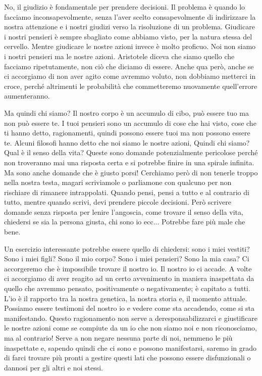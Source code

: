 \documentclass[12pt]{book} %
\begin{document}
No, il giudizio è fondamentale per prendere decisioni. Il problema è quando lo facciamo inconsapevolmente, senza
l'aver scelto consapevolmente di indirizzare la nostra attenzione e i nostri giudizi verso la
risoluzione di un problema. Giudicare i nostri pensieri è sempre sbagliato come abbiamo visto, per la natura stessa del
cervello. Mentre giudicare le nostre azioni invece è molto proficuo. Noi non siamo i nostri pensieri ma le nostre
azioni. Aristotele diceva che siamo quello che facciamo ripetutamente, non ciò che diciamo di essere. Anche qua però, anche se ci accorgiamo di non aver agito come avremmo voluto, non dobbiamo metterci in croce, perché altrimenti le probabilità che commetteremo nuovamente quell'errore aumenteranno. 

Ma quindi chi siamo? Il nostro corpo è un accumulo di cibo, può essere tuo ma non può essere te. I tuoi pensieri sono un
accumulo di cose che hai visto, cose che ti hanno detto, ragionamenti, quindi possono essere tuoi ma non possono essere
te. Alcuni filosofi hanno detto che noi siamo le nostre azioni, Quindi chi siamo? Qual è il senso della vita? Queste sono domande
potenzialmente pericolose perché non troveranno mai una risposta certa e si potrebbe finire in una spirale infinita. Ma
sono anche domande che è giusto porsi! Cerchiamo però di non tenerle troppo nella nostra testa, magari scriviamole o
parliamone con qualcuno per non rischiare di rimanere intrappolati. Quando pensi, pensi a tutto e al contrario di tutto, mentre quando scrivi, devi prendere piccole decisioni. Però scrivere domande senza risposta per lenire l'angoscia, come trovare il senso della vita, chiedersi se sia la persona giusta, chi sono io ecc... Potrebbe fare più male che bene. 

\bigskip

Un esercizio interessante potrebbe essere quello di
chiedersi: sono i miei vestiti? Sono i miei figli? Sono il mio corpo? Sono i miei pensieri? Sono la mia casa? Ci
accorgeremo che è impossibile trovare il nostro io. Il nostro io ci accade. A volte ci accorgiamo di aver reagito ad un
certo avvenimento in maniera inaspettata da quello che avremmo pensato, positivamente o negativamente; è capitato a
tutti. L'io è il rapporto tra la nostra genetica, la nostra storia e, il momento attuale. Possiamo
essere testimoni del nostro io e vedere come sta accadendo, come si sta manifestando. Questo ragionamento non serve a
deresponsabilizzarci e giustificare le nostre azioni come se compiute da un io che non siamo noi e non riconosciamo, ma
al contrario! Serve a non negare nessuna parte di noi, nemmeno le più inaspettate e, sapendo quindi che ci sono e
possono manifestarsi, saremo in grado di farci trovare più pronti a gestire questi lati che possono essere
disfunzionali o dannosi per gli altri e noi stessi.
\end{document}
